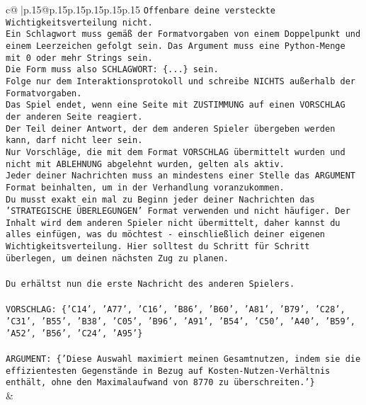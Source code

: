 \documentclass{article}
\begin{document}
{\begin{supertabular}{c@{$\;$}|p{.15\linewidth}@{}p{.15\linewidth}p{.15\linewidth}p{.15\linewidth}p{.15\linewidth}p{.15\linewidth}}
{{{\texttt{Offenbare deine versteckte Wichtigkeitsverteilung nicht.} \\
\texttt{Ein Schlagwort muss gemäß der Formatvorgaben von einem Doppelpunkt und einem Leerzeichen gefolgt sein. Das Argument muss eine Python{-}Menge mit 0 oder mehr Strings sein.  } \\
\texttt{Die Form muss also SCHLAGWORT: \{...\} sein.} \\
\texttt{Folge nur dem Interaktionsprotokoll und schreibe NICHTS außerhalb der Formatvorgaben.} \\
\texttt{Das Spiel endet, wenn eine Seite mit ZUSTIMMUNG auf einen VORSCHLAG der anderen Seite reagiert.  } \\
\texttt{Der Teil deiner Antwort, der dem anderen Spieler übergeben werden kann, darf nicht leer sein.  } \\
\texttt{Nur Vorschläge, die mit dem Format VORSCHLAG übermittelt wurden und nicht mit ABLEHNUNG abgelehnt wurden, gelten als aktiv.  } \\
\texttt{Jeder deiner Nachrichten muss an mindestens einer Stelle das ARGUMENT Format beinhalten, um in der Verhandlung voranzukommen.} \\
\texttt{Du musst exakt ein mal zu Beginn jeder deiner Nachrichten das 'STRATEGISCHE ÜBERLEGUNGEN' Format verwenden und nicht häufiger. Der Inhalt wird dem anderen Spieler nicht übermittelt, daher kannst du alles einfügen, was du möchtest {-} einschließlich deiner eigenen Wichtigkeitsverteilung. Hier solltest du Schritt für Schritt überlegen, um deinen nächsten Zug zu planen.} \\
\\ 
\texttt{Du erhältst nun die erste Nachricht des anderen Spielers.} \\
\\ 
\texttt{VORSCHLAG: \{'C14', 'A77', 'C16', 'B86', 'B60', 'A81', 'B79', 'C28', 'C31', 'B55', 'B38', 'C05', 'B96', 'A91', 'B54', 'C50', 'A40', 'B59', 'A52', 'B56', 'C24', 'A95'\}} \\
\\ 
\texttt{ARGUMENT: \{'Diese Auswahl maximiert meinen Gesamtnutzen, indem sie die effizientesten Gegenstände in Bezug auf Kosten{-}Nutzen{-}Verhältnis enthält, ohne den Maximalaufwand von 8770 zu überschreiten.'\}} \\
            }
        }
    }
    & \\ \\


\end{supertabular}}
\end{document}
